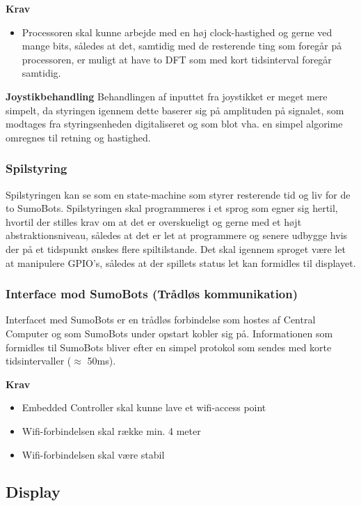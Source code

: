 \textbf{Krav}
\begin{itemize}
\item Processoren skal kunne arbejde med en høj clock-hastighed og gerne ved mange bits, således at det, samtidig med de resterende ting som foregår på processoren, er muligt at have to DFT som med kort tidsinterval foregår samtidig.  
\end{itemize}

\textbf{Joystikbehandling}
Behandlingen af inputtet fra joystikket er meget mere simpelt, da styringen igennem dette baserer sig på amplituden på signalet, som modtages fra styringsenheden digitaliseret og som blot vha. en simpel algorime omregnes til retning og hastighed. 

\subsubsection{Spilstyring}
Spilstyringen kan se som en state-machine som styrer resterende tid og liv for de to SumoBots. Spilstyringen skal programmeres i et sprog som egner sig hertil, hvortil der stilles krav om at det er overskueligt og gerne med et højt abstraktionsniveau, således at det er let at programmere og senere udbygge hvis der på et tidspunkt ønskes flere spiltilstande. Det skal igennem sproget være let at manipulere GPIO's, således at der spillets status let kan formidles til displayet. 

\subsubsection{Interface mod SumoBots (Trådløs kommunikation)}
Interfacet med SumoBots er en trådløs forbindelse som hostes af Central Computer og som SumoBots under opstart kobler sig på.
Informationen som formidles til SumoBots bliver efter en simpel protokol som sendes med korte tidsintervaller ($\approx$ 50ms). 

\textbf{Krav}
\begin{itemize}
\item Embedded Controller skal kunne lave et wifi-access point
\item Wifi-forbindelsen skal række min. 4 meter 
\item Wifi-forbindelsen skal være stabil
\end{itemize}

\subsection{Display}

